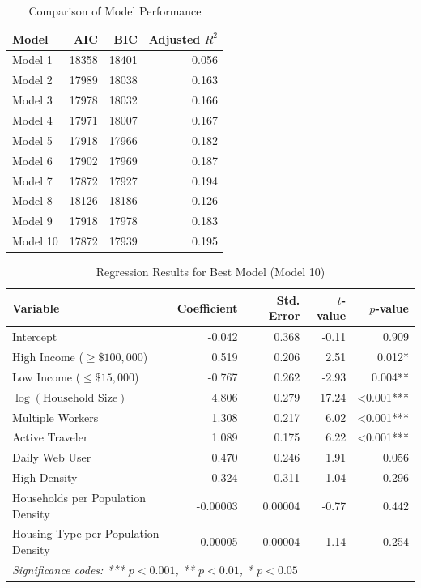 \documentclass[12pt]{article}
\begin{document}
\begin{table}[h]
\centering
\caption{Comparison of Model Performance}
\label{tab:model_comparison}
\begin{tabular}{lrrr}
\toprule
Model & AIC & BIC & Adjusted $R^2$ \\
\midrule
Model 1 & 18358 & 18401 & 0.056 \\
Model 2 & 17989 & 18038 & 0.163 \\
Model 3 & 17978 & 18032 & 0.166 \\
Model 4 & 17971 & 18007 & 0.167 \\
Model 5 & 17918 & 17966 & 0.182 \\
Model 6 & 17902 & 17969 & 0.187 \\
Model 7 & 17872 & 17927 & 0.194 \\
Model 8 & 18126 & 18186 & 0.126 \\
Model 9 & 17918 & 17978 & 0.183 \\
Model 10 & 17872 & 17939 & 0.195 \\
\bottomrule
\end{tabular}
\end{table}


\begin{table}[h]
\centering
\caption{Regression Results for Best Model (Model 10)}
\label{tab:best_model}
\begin{tabular}{lrrrr}
\toprule
Variable & Coefficient & Std. Error & $t$-value & $p$-value \\
\midrule
Intercept & -0.042 & 0.368 & -0.11 & 0.909 \\
High Income ($\geq\$100,000$) & 0.519 & 0.206 & 2.51 & 0.012* \\
Low Income ($\leq\$15,000$) & -0.767 & 0.262 & -2.93 & 0.004** \\
$\log(\text{Household Size})$ & 4.806 & 0.279 & 17.24 & <0.001*** \\
Multiple Workers & 1.308 & 0.217 & 6.02 & <0.001*** \\
Active Traveler & 1.089 & 0.175 & 6.22 & <0.001*** \\
Daily Web User & 0.470 & 0.246 & 1.91 & 0.056 \\
High Density & 0.324 & 0.311 & 1.04 & 0.296 \\
Households per Population Density & -0.00003 & 0.00004 & -0.77 & 0.442 \\
Housing Type per Population Density & -0.00005 & 0.00004 & -1.14 & 0.254 \\
\bottomrule
\multicolumn{5}{l}{\textit{Significance codes: *** $p<0.001$, ** $p<0.01$, * $p<0.05$}}
\end{tabular}
\end{table}
\end{document}
